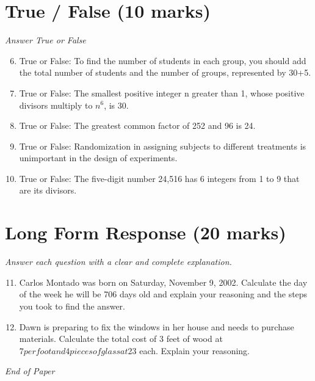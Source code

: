 \documentclass[12pt]{article}
\begin{document}
\section*{True / False (10 marks)}
\textit{Answer True or False}
\begin{enumerate}[label=\arabic*.]
\setcounter{enumi}{5}
\item True or False: To find the number of students in each group, you should add the total number of students and the number of groups, represented by 30+5.
\item True or False: The smallest positive integer n greater than 1, whose positive divisors multiply to $n^6$, is 30.
\item True or False: The greatest common factor of 252 and 96 is 24.
\item True or False: Randomization in assigning subjects to different treatments is unimportant in the design of experiments.
\item True or False: The five-digit number 24,516 has 6 integers from 1 to 9 that are its divisors.
\end{enumerate}

\section*{Long Form Response (20 marks)}
\textit{Answer each question with a clear and complete explanation.}
\begin{enumerate}[label=\arabic*.]
\setcounter{enumi}{10}
\item Carlos Montado was born on Saturday, November 9, 2002. Calculate the day of the week he will be 706 days old and explain your reasoning and the steps you took to find the answer.
\item Dawn is preparing to fix the windows in her house and needs to purchase materials. Calculate the total cost of 3 feet of wood at $7 per foot and 4 pieces of glass at $23 each. Explain your reasoning.
\end{enumerate}

\vfill
\noindent\textit{End of Paper}
\end{document}
